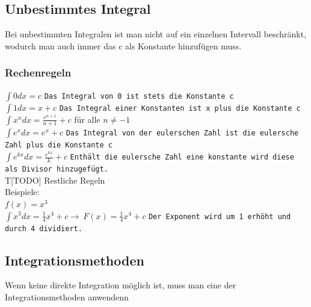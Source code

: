 \documentclass{article}
\begin{document}
	\subsection{Unbestimmtes Integral}
	Bei unbestimmten Integralen ist man nicht auf ein einzelnen Intervall beschränkt, wodurch man auch immer das c als Konstante hinzufügen muss.
	\subsubsection{Rechenregeln}
	$\int 0dx=c$ \verb|Das Integral von 0 ist stets die Konstante c| \\
	$\int 1dx=x+c$ \verb|Das Integral einer Konstanten ist x plus die Konstante c| \\
	$\int x^ndx=\frac{c^{n+1}}{n+1}+c$ für alle $n\ne -1$ \\
	$\int e^xdx=e^x+c$ \verb|Das Integral von der eulerschen Zahl ist die eulersche Zahl plus die Konstante c| \\
	$\int e^{kx}dx=\frac{e^{kx}}{k}+c$ \verb|Enthält die eulersche Zahl eine konstante wird diese als Divisor hinzugefügt.| \\
	T[TODO] Restliche Regeln \\
	Beispiele: \\
	$f(x)=x^3$ \\
	$\int x^3dx=\frac{1}{4}x^4+c\to\ F(x)=\frac{1}{4}x^4+c$ \verb|Der Exponent wird um 1 erhöht und durch 4 dividiert.| \\
	\subsection{Integrationsmethoden}
	Wenn keine direkte Integration möglich ist, muss man eine der Integrationsmethoden anwendenn
\end{document}

